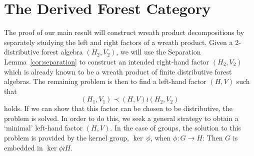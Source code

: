 \documentclass[sigplan,9pt]{acmart}\settopmatter{printfolios=true,printccs=false,printacmref=false}
\newcounter{theorem}
\theoremstyle{definition}
\begin{document}

\section{The Derived Forest Category}\label{sec:categories}


The proof of our main result will construct wreath product decompositions by separately studying the left and right factors of a wreath product.
Given a 2-distributive forest algebra $(H_2, V_2)$, we will use the Separation Lemma~\ref{cor:separation} to construct an intended right-hand factor $(H_2, V_2)$ which is already known to be a wreath product of finite distributive forest algebras.
The remaining problem is then to find a left-hand factor $(H,V)$ such that
%
%
%
%
%
%
\begin{equation}\label{eq:wreath-eq}
(H_1,V_1) \prec (H,V) \wr (H_2,V_2)
\end{equation}
holds. If we can show that this factor can be chosen to be distributive, the problem is solved.
In order to do this, we seek a general strategy to obtain a `minimal' left-hand factor $(H,V)$.
%
In the case of groups, the solution to this problem is provided by the kernel group, $\operatorname{ker}\ \phi$, when $\phi : G\rightarrow H$: Then $G$ is embedded in $\operatorname{ker} \phi \wr H$.
\end{document}
